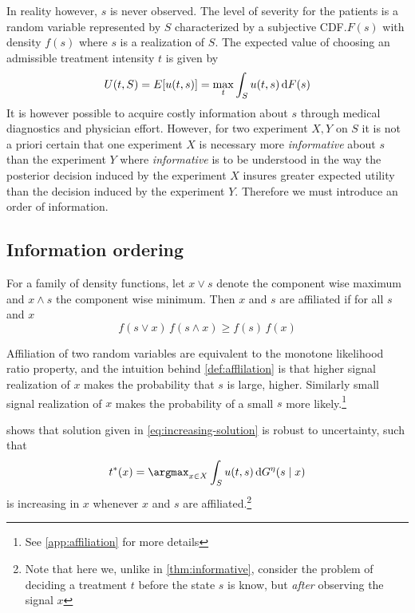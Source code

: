In reality however, $s$ is never observed. The level of severity for the patients is a random variable represented by $S$  characterized by a subjective CDF.\@ $F(s)$  with density $f(s)$  where $s$ is a realization of $S$. The expected value of choosing an admissible treatment intensity $t$ is given by
\[
	U(t,S)=E[u(t,s)]=\max_{t}\int_{S}u(t,s)\dif F(s)\label{eq:expected-utility-prior}
\]
It is however possible to acquire costly information about $s$ through medical diagnostics and physician effort. However, for two experiment $X,Y$ on $S$  it is not a priori certain that one experiment $X$ is necessary more \emph{informative} about $s$ than the experiment $Y$  where \emph{informative} is to be understood in the way the posterior decision induced by the experiment $X$ insures greater expected utility than the decision induced by the experiment $Y$. Therefore we must introduce an order of information.

\subsection{Information ordering}

\begin{definition}\label{def:afflilation} \parencite{Milgrom1982Theory}
For a family of density functions, let $x\lor s$ denote the component wise maximum and $x\land s$ the component wise minimum. Then $x$ and $s$ are affiliated if for all $s$ and $x$
\[
	f(s\lor x)\, f(s\land x)\ge f(s)\, f(x)
\]
\end{definition}

Affiliation of two random variables are equivalent to the monotone likelihood ratio property, and the intuition behind \cref{def:afflilation} is that higher signal realization of $x$ makes the probability that $s$ is large, higher. Similarly small signal realization of $x$ makes the probability of a small $s$ more likely.\footnote{See \cref{app:affiliation} for more details}

\textcite{Athey2002Monotone}  shows that solution given in \cref{eq:increasing-solution} is robust to uncertainty, such that
\[
	t^*(x)=\argmax_{x\in X}\int_S u(t,s)\dif G^\eta(s\mid x)
\]
is increasing in $x$  whenever $x$ and $s$ are affiliated.\footnote{Note that here we, unlike in \cref{thm:informative}, consider the problem of deciding a treatment $t$ before the state $s$ is know, but \emph{after} observing the signal $x$ }

